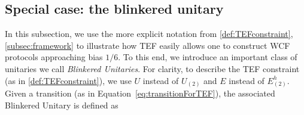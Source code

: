 \documentclass{theoretics}
\begin{document}
%
%
%
%


\subsection{Special case: the blinkered unitary\label{subsec:BlinkeredUnitary}}
In this subsection, we use the more explicit notation from \cref{def:TEFconstraint}, \cref{subsec:framework} to illustrate how TEF easily allows one to construct WCF protocols approaching bias $1/6$. To this end, we introduce an important class of unitaries we call \emph{Blinkered Unitaries}. For clarity, to describe the TEF constraint (as in \cref{def:TEFconstraint}), we use $U$ instead of $U_{(2)}$ and $E$ instead of $E^h_{(2)}$. Given a transition (as in Equation~\eqref{eq:transitionForTEF}), the associated Blinkered Unitary is defined as
%

%
%
%
%
\end{document}

